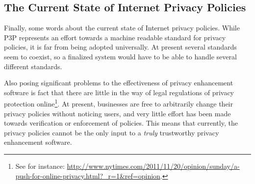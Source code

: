 \subsection{The Current State of Internet Privacy Policies}
Finally, some words about the current state of Internet privacy policies. While P3P represents
an effort towards a machine readable standard for privacy policies, it is far from being adopted
universally. At present several standards seem to coexist, so a finalized system would have to
be able to handle several different standards.

Also posing significant problems to the effectiveness of privacy enhancement software is fact 
that there are little in the way of legal regulations of privacy protection online\footnote{See for instance: \newline \url{http://www.nytimes.com/2011/11/20/opinion/sunday/a-push-for-online-privacy.html?_r=1&ref=opinion}.}.
At present, businesses are free to arbitrarily change their privacy policies without noticing users,
and very little effort has been made towards verification or enforcement of policies. This means that currently,
the privacy policies cannot be the only input to a \emph{truly} trustworthy privacy enhancement software.


